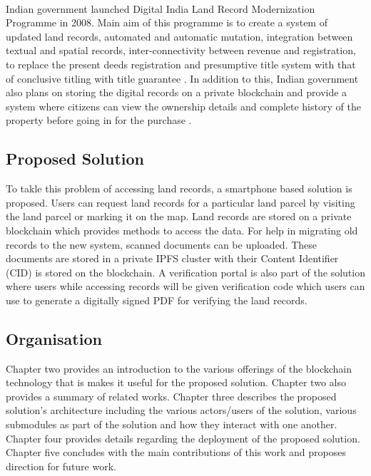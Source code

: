 \documentclass{article}
\begin{document}
        \paragraph{}
        Indian government launched Digital India Land Record Modernization Programme in 2008. Main aim of this programme is to create a system of updated land records, automated and automatic mutation, integration between textual and spatial records, inter-connectivity between revenue and registration, to replace the present deeds registration and presumptive title system with that of conclusive titling with title guarantee \cite{dilrmp}. In addition to this, Indian government also plans on storing the digital records on a private blockchain and provide a system where citizens can view the ownership details and complete history of the property before going in for the purchase \cite{blockchaingovin}.  

    \subsection{Proposed Solution}
        To takle this problem of accessing land records, a smartphone based solution is proposed. Users can request land records for a particular land parcel by visiting the land parcel or marking it on the map. Land records are stored on a private blockchain which provides methods to access the data. For help in migrating old records to the new system, scanned documents can be uploaded. These documents are stored in a private IPFS cluster with their Content Identifier (CID) is stored on the blockchain. A verification portal is also part of the solution where users while accessing records will be given verification code which users can use to generate a digitally signed PDF for verifying the land records. 
        
    \subsection{Organisation}
        Chapter two provides an introduction to the various offerings of the blockchain technology that is makes it useful for the proposed solution. Chapter two also provides a summary of related works. Chapter three describes the proposed solution's architecture including the various actors/users of the solution, various submodules as part of the solution and how they interact with one another. Chapter four provides details regarding the deployment of the proposed solution. Chapter five concludes with the main contributions of this work and proposes direction for future work.
        
\end{document}
